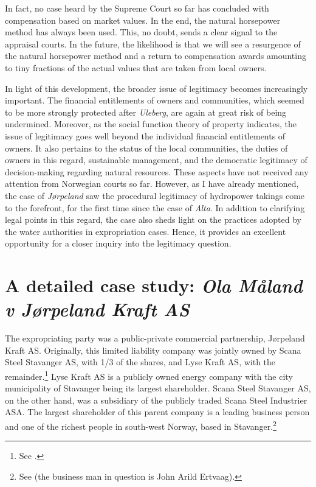 In fact, no case heard by the Supreme Court so far has concluded with compensation based on market values. In the end, the natural horsepower method has always been used. This, no doubt, sends a clear signal to the appraisal courts. In the future, the likelihood is that we will see a resurgence of the natural horsepower method and a return to compensation awards amounting to tiny fractions of the actual values that are taken from local owners.

In light of this development, the broader issue of legitimacy becomes increasingly important. The financial entitlements of owners and communities, which seemed to be more strongly protected after {\it Uleberg}, are again at great risk of being undermined. Moreover, as the social function theory of property indicates, the issue of legitimacy goes well beyond the individual financial entitlements of owners. It also pertains to the status of the local communities, the duties of owners in this regard, sustainable management, and the democratic legitimacy of decision-making regarding natural resources. These aspects have not received any attention from Norwegian courts so far. However, as I have already mentioned, the case of {\it Jørpeland} saw the procedural legitimacy of hydropower takings come to the forefront, for the first time since the case of {\it Alta}. In addition to clarifying legal points in this regard, the case also sheds light on the practices adopted by the water authorities in expropriation cases. Hence, it provides an excellent opportunity for a closer inquiry into the legitimacy question.

\section{A detailed case study: {\it Ola Måland v Jørpeland Kraft AS}}\label{sec:5:6}

The expropriating party was a public-private commercial partnership, Jørpeland Kraft AS. Originally, this limited liability company was jointly owned by Scana Steel Stavanger AS, with 1/3 of the shares, and Lyse Kraft AS, with the remainder.\footnote{See \cite[2]{jorpeland09}.} Lyse Kraft AS is a publicly owned energy company with the city municipality of Stavanger being its largest shareholder. Scana Steel Stavanger AS, on the other hand, was a subsidiary of the publicly traded Scana Steel Industrier ASA. The largest shareholder of this parent company is a leading business person and one of the richest people in south-west Norway, based in Stavanger.\footnote{See \cite{birkevold09} (the business man in question is John Arild Ertvaag).}

